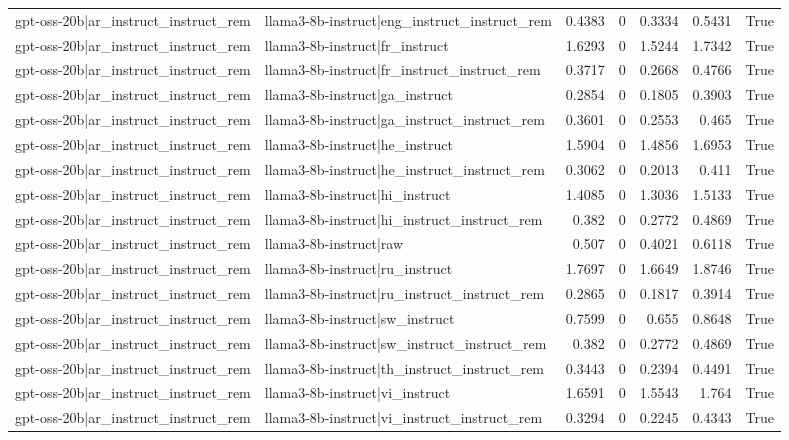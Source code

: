 \begin{table}
\begin{tabular}{l l r r r r l}
gpt-oss-20b|ar_instruct_instruct_rem & llama3-8b-instruct|eng_instruct_instruct_rem & 0.4383 & 0 & 0.3334 & 0.5431 & True \\
gpt-oss-20b|ar_instruct_instruct_rem & llama3-8b-instruct|fr_instruct & 1.6293 & 0 & 1.5244 & 1.7342 & True \\
gpt-oss-20b|ar_instruct_instruct_rem & llama3-8b-instruct|fr_instruct_instruct_rem & 0.3717 & 0 & 0.2668 & 0.4766 & True \\
gpt-oss-20b|ar_instruct_instruct_rem & llama3-8b-instruct|ga_instruct & 0.2854 & 0 & 0.1805 & 0.3903 & True \\
gpt-oss-20b|ar_instruct_instruct_rem & llama3-8b-instruct|ga_instruct_instruct_rem & 0.3601 & 0 & 0.2553 & 0.465 & True \\
gpt-oss-20b|ar_instruct_instruct_rem & llama3-8b-instruct|he_instruct & 1.5904 & 0 & 1.4856 & 1.6953 & True \\
gpt-oss-20b|ar_instruct_instruct_rem & llama3-8b-instruct|he_instruct_instruct_rem & 0.3062 & 0 & 0.2013 & 0.411 & True \\
gpt-oss-20b|ar_instruct_instruct_rem & llama3-8b-instruct|hi_instruct & 1.4085 & 0 & 1.3036 & 1.5133 & True \\
gpt-oss-20b|ar_instruct_instruct_rem & llama3-8b-instruct|hi_instruct_instruct_rem & 0.382 & 0 & 0.2772 & 0.4869 & True \\
gpt-oss-20b|ar_instruct_instruct_rem & llama3-8b-instruct|raw & 0.507 & 0 & 0.4021 & 0.6118 & True \\
gpt-oss-20b|ar_instruct_instruct_rem & llama3-8b-instruct|ru_instruct & 1.7697 & 0 & 1.6649 & 1.8746 & True \\
gpt-oss-20b|ar_instruct_instruct_rem & llama3-8b-instruct|ru_instruct_instruct_rem & 0.2865 & 0 & 0.1817 & 0.3914 & True \\
gpt-oss-20b|ar_instruct_instruct_rem & llama3-8b-instruct|sw_instruct & 0.7599 & 0 & 0.655 & 0.8648 & True \\
gpt-oss-20b|ar_instruct_instruct_rem & llama3-8b-instruct|sw_instruct_instruct_rem & 0.382 & 0 & 0.2772 & 0.4869 & True \\
gpt-oss-20b|ar_instruct_instruct_rem & llama3-8b-instruct|th_instruct_instruct_rem & 0.3443 & 0 & 0.2394 & 0.4491 & True \\
gpt-oss-20b|ar_instruct_instruct_rem & llama3-8b-instruct|vi_instruct & 1.6591 & 0 & 1.5543 & 1.764 & True \\
gpt-oss-20b|ar_instruct_instruct_rem & llama3-8b-instruct|vi_instruct_instruct_rem & 0.3294 & 0 & 0.2245 & 0.4343 & True \\

\end{tabular}
\end{table}
